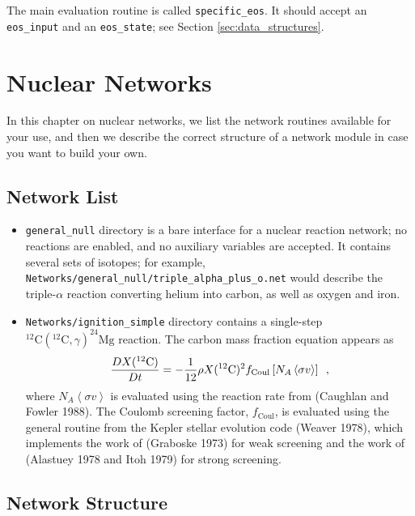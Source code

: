 \documentclass[11pt]{book}
\begin{document}
The main evaluation routine is called {\tt specific\_eos}. It should accept 
an {\tt eos\_input} and an {\tt eos\_state}; see Section \ref{sec:data_structures}.



\chapter{Nuclear Networks}

In this chapter on nuclear networks, we list the network routines available for your use, and 
then we describe the correct structure of a network module in case you want to build your own.

\section{Network List}

\begin{itemize}

\item {\tt general\_null} directory is a bare interface for a
  nuclear reaction network; no reactions are enabled, and no
  auxiliary variables are accepted. It contains several sets of
  isotopes; for example,
  {\tt Networks/general\_null/triple\_alpha\_plus\_o.net} would describe the
  triple-$\alpha$ reaction converting helium into carbon, as well as
  oxygen and iron.

\item {\tt Networks/ignition\_simple} directory contains a single-step
  $^{12}\mathrm{C}(^{12}\mathrm{C},\gamma)^{24}\mathrm{Mg}$ reaction.
  The carbon mass fraction equation appears as
\begin{equation}
\frac{D X(^{12}\mathrm{C})}{Dt} = - \frac{1}{12} \rho X(^{12}\mathrm{C})^2
    f_\mathrm{Coul} \left [N_A \left <\sigma v \right > \right]\enskip,
\end{equation}
where $N_A \left <\sigma v\right>$ is evaluated using the reaction
rate from (Caughlan and Fowler 1988).  The Coulomb screening factor,
$f_\mathrm{Coul}$, is evaluated using the general routine from the
Kepler stellar evolution code (Weaver 1978), which implements the work
of (Graboske 1973) for weak screening and the work of (Alastuey 1978
and Itoh 1979) for strong screening.

\end{itemize}

\section{Network Structure}
\end{document}
